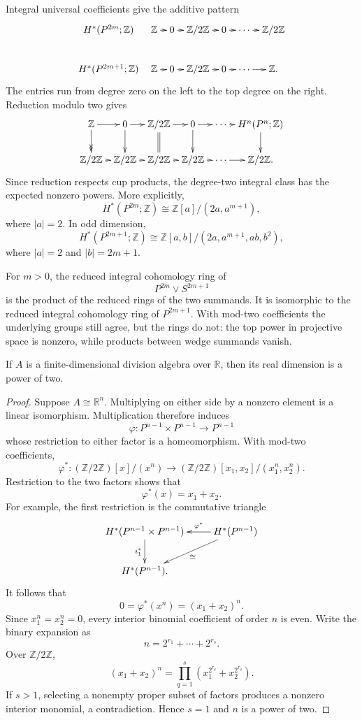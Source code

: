 \noindent
Integral universal coefficients give the
additive pattern
$$
\xymatrix@C=.65em{
H^*(P^{2m};\mathbb{Z})
  & \mathbb{Z} \ar[r]
  & 0 \ar[r]
  & \mathbb{Z}/2\mathbb{Z} \ar[r]
  & 0 \ar[r]
  & \cdots \ar[r]
  & \mathbb{Z}/2\mathbb{Z} \\
H^*(P^{2m+1};\mathbb{Z})
  & \mathbb{Z} \ar[r]
  & 0 \ar[r]
  & \mathbb{Z}/2\mathbb{Z} \ar[r]
  & 0 \ar[r]
  & \cdots \ar[r]
  & \mathbb{Z}.
}
$$
The entries run from degree zero on the
left to the top degree on the right.
Reduction modulo two gives
$$
\xymatrix@C=.55em@R=2em{
\mathbb{Z} \ar[r]
  \ar@{->>}[d]
  & 0 \ar[r] \ar[d]
  & \mathbb{Z}/2\mathbb{Z}
    \ar[r] \ar@{=}[d]
  & 0 \ar[r] \ar[d]
  & \cdots \ar[r]
  & H^n(P^n;\mathbb{Z}) \ar[d] \\
\mathbb{Z}/2\mathbb{Z} \ar[r]
  & \mathbb{Z}/2\mathbb{Z} \ar[r]
  & \mathbb{Z}/2\mathbb{Z} \ar[r]
  & \mathbb{Z}/2\mathbb{Z} \ar[r]
  & \cdots \ar[r]
  & \mathbb{Z}/2\mathbb{Z}.
}
$$
Since reduction respects cup products, the
degree-two integral class has the expected
nonzero powers.  More explicitly,
$$
H^*(P^{2m};\mathbb{Z})
\cong
\mathbb{Z}[a]/(2a,a^{m+1}),
$$
where $|a|=2$.  In odd dimension,
$$
H^*(P^{2m+1};\mathbb{Z})
\cong
\mathbb{Z}[a,b]/
(2a,a^{m+1},ab,b^2),
$$
where $|a|=2$ and $|b|=2m+1$.

\noindent
For $m>0$, the reduced integral cohomology
ring of
$$
P^{2m}\vee S^{2m+1}
$$
is the product of the reduced rings of the
two summands.  It is isomorphic to the
reduced integral cohomology ring of
$P^{2m+1}$.  With mod-two coefficients the
underlying groups still agree, but the
rings do not: the top power in projective
space is nonzero, while products between
wedge summands vanish.

\begin{theorem}[Hopf]
\label{at-theorem-hopf-division-dimension}
If $A$ is a finite-dimensional division
algebra over $\mathbb{R}$, then its real
dimension is a power of two.
\end{theorem}

\begin{proof}
Suppose $A\cong\mathbb{R}^n$.  Multiplying
on either side by a nonzero element is a
linear isomorphism.  Multiplication
therefore induces
$$
\varphi:P^{n-1}\times P^{n-1}
\longrightarrow P^{n-1}
$$
whose restriction to either factor is a
homeomorphism.  With mod-two coefficients,
$$
\varphi^*:
(\mathbb{Z}/2\mathbb{Z})[x]/(x^n)
\longrightarrow
(\mathbb{Z}/2\mathbb{Z})[x_1,x_2]/
(x_1^n,x_2^n).
$$
Restriction to the two factors shows that
$$
\varphi^*(x)=x_1+x_2.
$$
For example, the first restriction is the
commutative triangle
$$
\xymatrix{
H^*(P^{n-1}\times P^{n-1})
  \ar[d]_{i_1^*}
  & H^*(P^{n-1})
    \ar[l]_-{\varphi^*}
    \ar[ld]^\cong \\
H^*(P^{n-1}).
}
$$
It follows that
$$
0=\varphi^*(x^n)=(x_1+x_2)^n.
$$
Since $x_1^n=x_2^n=0$, every interior
binomial coefficient of order $n$ is even.
Write the binary expansion as
$$
n=2^{r_1}+\cdots+2^{r_s}.
$$
Over $\mathbb{Z}/2\mathbb{Z}$,
$$
(x_1+x_2)^n
=
\prod_{q=1}^s
(x_1^{2^{r_q}}+x_2^{2^{r_q}}).
$$
If $s>1$, selecting a nonempty proper
subset of factors produces a nonzero
interior monomial, a contradiction.  Hence
$s=1$ and $n$ is a power of two.
\end{proof}
